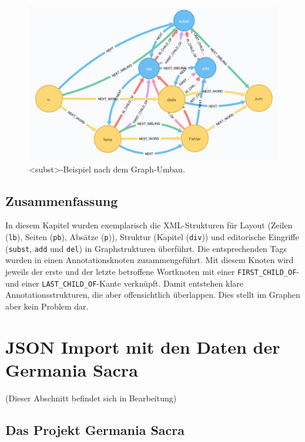\begin{figure}
\centering
\includegraphics{Bilder/TEI2Graph/subst-add-del-bearbeitet.png}
\caption{\textless subst\textgreater-Beispiel nach dem Graph-Umbau.}
\end{figure}

\hypertarget{zusammenfassung-6}{%
\subsection{Zusammenfassung}\label{zusammenfassung-6}}

In diesem Kapitel wurden exemplarisch die XML-Strukturen für Layout
(Zeilen (\texttt{lb}), Seiten (\texttt{pb}), Absätze (\texttt{p})),
Struktur (Kapitel (\texttt{div})) und editorische Eingriffe
(\texttt{subst}, \texttt{add} und \texttt{del}) in Graphstrukturen
überführt. Die entsprechenden Tags wurden in einen Annotationsknoten
zusammengeführt. Mit diesem Knoten wird jeweils der erste und der letzte
betroffene Wortknoten mit einer \texttt{FIRST\_CHILD\_OF}- und einer
\texttt{LAST\_CHILD\_OF}-Kante verknüpft. Damit entstehen klare
Annotationsstrukturen, die aber offensichtlich überlappen. Dies stellt
im Graphen aber kein Problem dar.

\hypertarget{json-import-mit-den-daten-der-germania-sacra}{%
\section{JSON Import mit den Daten der Germania
Sacra}\label{json-import-mit-den-daten-der-germania-sacra}}

(Dieser Abschnitt befindet sich in Bearbeitung)

\hypertarget{das-projekt-germania-sacra}{%
\subsection{Das Projekt Germania
Sacra}\label{das-projekt-germania-sacra}}

